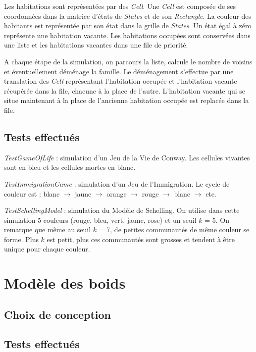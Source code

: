 \documentclass[a4paper, 11pt]{article}
\begin{document}
Les habitations sont représentées par des \textit{Cell}. Une \textit{Cell} est composée de ses coordonnées dans la matrice d'états de \textit{States} et de son \textit{Rectangle}. La couleur des habitants est représentée par son état dans la grille de \textit{States}. Un état égal à zéro représente une habitation vacante. Les habitations occupées sont conservées dans une liste et les habitations vacantes dans une file de priorité.

A chaque étape de la simulation, on parcours la liste, calcule le nombre de voisins et éventuellement déménage la famille. Le déménagement s'effectue par une translation des \textit{Cell} représentant l'habitation occupée et l'habitation vacante récupérée dans la file, chacune à la place de l'autre. L'habitation vacante qui se situe maintenant à la place de l'ancienne habitation occupée est replacée dans la file.


\subsection*{Tests effectués}

\textit{TestGameOfLife} : simulation d'un Jeu de la Vie de Conway. Les cellules vivantes sont en bleu et les cellules mortes en blanc.

\textit{TestImmigrationGame} : simulation d'un Jeu de l'Immigration. Le cycle de couleur est : blanc $\rightarrow$ jaune $\rightarrow$ orange $\rightarrow$ rouge $\rightarrow$ blanc $\rightarrow$ etc.

\textit{TestSchellingModel} : simulation du Modèle de Schelling. On utilise dans cette simulation 5 couleurs (rouge, bleu, vert, jaune, rose) et un seuil $k$ = 5. On remarque que même au seuil $k$ = 7, de petites communautés de même couleur se forme. Plus $k$ est petit, plus ces communautés sont grosses et tendent à être unique pour chaque couleur.

\section{Modèle des boids}

\subsection*{Choix de conception}


\subsection*{Tests effectués}
\end{document}
